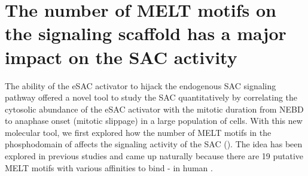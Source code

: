 \section{The number of MELT motifs on the  signaling scaffold has a major impact on the SAC activity}

The ability of the eSAC activator to hijack the endogenous SAC signaling pathway offered a novel tool to study the SAC quantitatively by correlating the cytosolic abundance of the eSAC activator with the mitotic duration from NEBD to anaphase onset (mitotic slippage) in a large population of cells. With this new molecular tool, we first explored how the number of MELT motifs in the phosphodomain of  affects the signaling activity of the SAC (). The idea has been explored in previous studies and came up naturally because there are 19 putative MELT motifs with various affinities to bind - in human  \cite{RecombinantKNL1, MELTActivity}.

